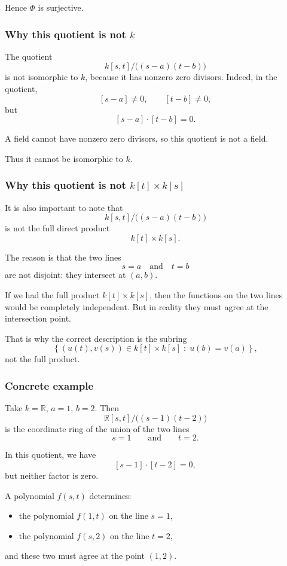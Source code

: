 \documentclass[12pt,a4paper]{article}
\theoremstyle{notespace}
\theoremstyle{definition}
\begin{document}
Hence \(\Phi\) is surjective.

\subsubsection{Why this quotient is not \(k\)}

The quotient
\[
k[s,t]\big/\bigl((s-a)(t-b)\bigr)
\]
is not isomorphic to \(k\), because it has nonzero zero divisors. Indeed, in the quotient,
\[
[s-a]\neq 0,\qquad [t-b]\neq 0,
\]
but
\[
[s-a]\cdot [t-b]=0.
\]

A field cannot have nonzero zero divisors, so this quotient is not a field.

Thus it cannot be isomorphic to \(k\).

\subsubsection{Why this quotient is not \(k[t]\times k[s]\)}

It is also important to note that
\[
k[s,t]\big/\bigl((s-a)(t-b)\bigr)
\]
is not the full direct product
\[
k[t]\times k[s].
\]

The reason is that the two lines
\[
s=a
\quad\text{and}\quad
t=b
\]
are not disjoint: they intersect at \((a,b)\).

If we had the full product \(k[t]\times k[s]\), then the functions on the two lines would be completely independent. But in reality they must agree at the intersection point.

That is why the correct description is the subring
\[
\left\{(u(t),v(s))\in k[t]\times k[s]\;:\; u(b)=v(a)\right\},
\]
not the full product.

\subsubsection{Concrete example}

Take \(k=\mathbb{R}\), \(a=1\), \(b=2\). Then
\[
\mathbb{R}[s,t]\big/\bigl((s-1)(t-2)\bigr)
\]
is the coordinate ring of the union of the two lines
\[
s=1
\qquad\text{and}\qquad
t=2.
\]

In this quotient, we have
\[
[s-1]\cdot [t-2]=0,
\]
but neither factor is zero.

A polynomial \(f(s,t)\) determines:

\begin{itemize}
	\item the polynomial \(f(1,t)\) on the line \(s=1\),
	\item the polynomial \(f(s,2)\) on the line \(t=2\),
\end{itemize}
and these two must agree at the point \((1,2)\).
\end{document}
